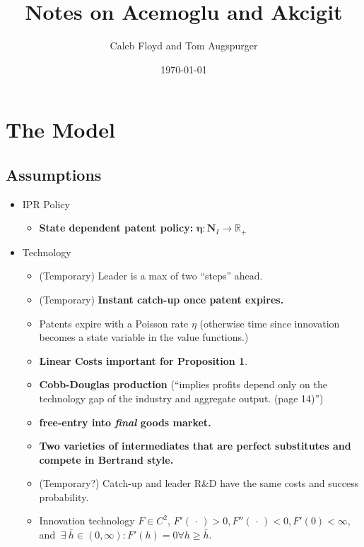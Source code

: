 \documentclass[11pt]{article}
\title{Notes on Acemoglu and Akcigit}
\author{Caleb Floyd and Tom Augspurger}
\date{\today}
\begin{document}
\maketitle

\section{The Model}
\label{sec:the_model}

\subsection{Assumptions}
\label{sub:assumptions}

  \begin{itemize}
    \item IPR Policy
    \begin{itemize}
      \item \textbf{State dependent patent policy:} $\bm{\eta} : \bm{N}_I \rightarrow \mathbb{R_+}$      
    \end{itemize}

    \item Technology
    \begin{itemize}
      \item (Temporary) Leader is a max of two ``steps'' ahead.
      \item (Temporary) \textbf{Instant catch-up once patent expires.}
      \item Patents expire with a Poisson rate $\eta$ (otherwise time since innovation becomes a state variable in the value functions.)
      \item \textbf{Linear Costs important for Proposition 1}.
      \item \textbf{Cobb-Douglas production} (``implies profits depend only on the technology gap of the industry and aggregate output. (page 14)'')
      \item \textbf{free-entry into \emph{final} goods market.}  
      \item \textbf{Two varieties of intermediates that are perfect substitutes and compete in Bertrand style.}
      \item (Temporary?) Catch-up and leader R\&D have the same costs and success probability.
      \item Innovation technology $F \in C^2$, $F'(\,\cdot\,) > 0, F''(\,\cdot\,) < 0, F'(0) < \infty$, and $\ \exists\ \bar{h} \in (0, \infty) : F'(h) = 0 \forall h \geq \bar{h}$.
    \end{itemize}
    

\end{itemize}
\end{document}
